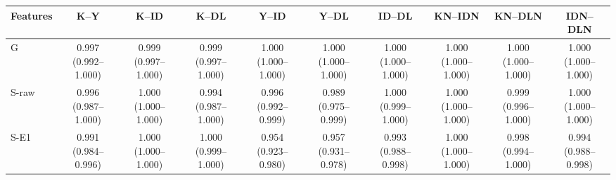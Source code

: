 \begin{tabular}{@{}lccccccccc@{}}
\toprule
Features & K--Y & K--ID & K--DL & Y--ID & Y--DL & ID--DL & KN--IDN & KN--DLN & IDN--DLN \\
\midrule
G & \makecell{0.997\\{\scriptsize (0.992--1.000)}} & \makecell{0.999\\{\scriptsize (0.997--1.000)}} & \makecell{0.999\\{\scriptsize (0.997--1.000)}} & \makecell{1.000\\{\scriptsize (1.000--1.000)}} & \makecell{1.000\\{\scriptsize (1.000--1.000)}} & \makecell{1.000\\{\scriptsize (1.000--1.000)}} & \makecell{1.000\\{\scriptsize (1.000--1.000)}} & \makecell{1.000\\{\scriptsize (1.000--1.000)}} & \makecell{1.000\\{\scriptsize (1.000--1.000)}} \\
S-raw & \makecell{0.996\\{\scriptsize (0.987--1.000)}} & \makecell{1.000\\{\scriptsize (1.000--1.000)}} & \makecell{0.994\\{\scriptsize (0.987--1.000)}} & \makecell{0.996\\{\scriptsize (0.992--0.999)}} & \makecell{0.989\\{\scriptsize (0.975--0.999)}} & \makecell{1.000\\{\scriptsize (0.999--1.000)}} & \makecell{1.000\\{\scriptsize (1.000--1.000)}} & \makecell{0.999\\{\scriptsize (0.996--1.000)}} & \makecell{1.000\\{\scriptsize (1.000--1.000)}} \\
S-E1 & \makecell{0.991\\{\scriptsize (0.984--0.996)}} & \makecell{1.000\\{\scriptsize (1.000--1.000)}} & \makecell{1.000\\{\scriptsize (0.999--1.000)}} & \makecell{0.954\\{\scriptsize (0.923--0.980)}} & \makecell{0.957\\{\scriptsize (0.931--0.978)}} & \makecell{0.993\\{\scriptsize (0.988--0.998)}} & \makecell{1.000\\{\scriptsize (1.000--1.000)}} & \makecell{0.998\\{\scriptsize (0.994--1.000)}} & \makecell{0.994\\{\scriptsize (0.988--0.998)}} \\

\end{tabular}
